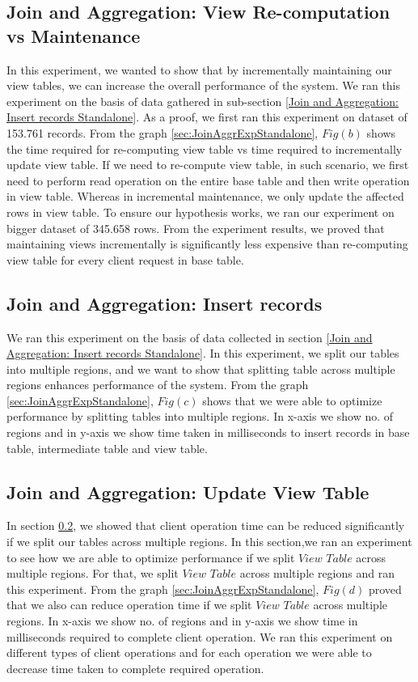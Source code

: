 \documentclass[11pt,a4paper,bibtotoc,idxtotoc,headsepline,footsepline,footexclude,BCOR12mm,DIV13]{scrbook}
\begin{document}
\subsection{Join and Aggregation: View Re-computation vs Maintenance}
\label{Join and Aggregation: View Re-computation vs Maintenance Standalone}
In this experiment, we wanted to show that by incrementally maintaining our view tables, we can increase the overall performance of the system. We ran this experiment on the basis of data gathered in sub-section \ref{Join and Aggregation: Insert records Standalone}. As a proof, we first ran this experiment on dataset of 153.761 records. From the graph \ref{sec:JoinAggrExpStandalone}, $Fig(b)$ shows the time required for re-computing view table vs time required to incrementally update view table. If we need to re-compute view table, in such scenario, we first need to perform read operation on the entire base table and then write operation in view table. Whereas in incremental maintenance, we only update the affected rows in view table. To ensure our hypothesis works, we ran our experiment on bigger dataset of 345.658 rows. From the experiment results, we proved that maintaining views incrementally is significantly less expensive than re-computing view table for every client request in base table.

\subsection{Join and Aggregation: Insert records}
\label{Join and Aggregation: Insert Records Standalone}
We ran this experiment on the basis of data collected in section \ref{Join and Aggregation: Insert records Standalone}. In this experiment, we split our tables into multiple regions, and we want to show that splitting table across multiple regions enhances performance of the system. From the graph \ref{sec:JoinAggrExpStandalone}, $Fig(c)$ shows that we were able to optimize performance by splitting tables into multiple regions. In x-axis we show no. of regions and in y-axis we show time taken in milliseconds to insert records in base table, intermediate table and view table.

\subsection{Join and Aggregation: Update View Table} 
\label{Join and Aggr: Update View Table Standalone}
In section \ref{Join and Aggregation: Insert Records Standalone}, we showed that client operation time can be reduced significantly if we split our tables across multiple regions. In this section,we ran an experiment to see how we are able to optimize performance if we split $View$ $Table$ across multiple regions. For that, we split $View$ $Table$ across multiple regions and ran this experiment. From the graph \ref{sec:JoinAggrExpStandalone}, $Fig(d)$ proved that we also can reduce operation time if we split $View$ $Table$ across multiple regions. In x-axis we show no. of regions and in y-axis we show time in milliseconds required to complete client operation. We ran this experiment on different types of client operations and for each operation we were able to decrease time taken to complete required operation. 
\end{document}
